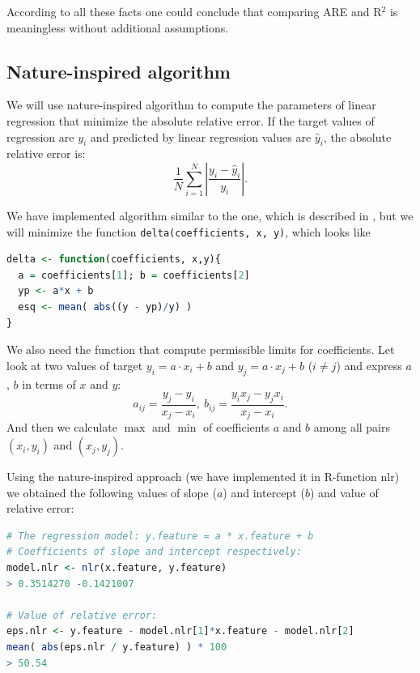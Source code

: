 According to all these facts one could conclude that comparing ARE and R$^2$  is meaningless without additional assumptions.


\subsection{Nature-inspired algorithm}
We will use nature-inspired algorithm to compute the parameters of linear regression that minimize the absolute relative error. If the target values of regression are $y_i$ and predicted by linear regression values are $\hat{y}_i$, the  absolute relative error is:
\begin{equation}
\frac{1}{N} \sum_{i=1}^{N}{\left\vert \frac{y_i - \hat{y}_i}{y_i} \right\vert}.
\end{equation}

We have implemented algorithm similar to the one, which is described in \cite{CCODA_Mirkin}, but we will minimize the function \texttt{delta(coefficients, x, y)}, which looks like
\begin{lstlisting}[language=R]
delta <- function(coefficients, x,y){
  a = coefficients[1]; b = coefficients[2]
  yp <- a*x + b
  esq <- mean( abs((y - yp)/y) ) 
} 
\end{lstlisting}

We also need the function that compute permissible limits for coefficients. Let look at two values of target $y_i = a \cdot x_i + b$ and $y_j = a \cdot x_j + b$ ($i \neq j$) and express $a$, $b$ in terms of $x$ and $y$:
\begin{equation*}
a_{ij} = \frac{y_j - y_i}{x_j - x_i}, \ b_{ij} = \frac{y_i x_j - y_j x_i}{x_j - x_i}.
\end{equation*}
And then we calculate $\max$ and $\min$ of coefficients $a$ and $b$ among all pairs $(x_i,y_i)$ and $(x_j,y_j)$. 


Using the nature-inspired approach (we have implemented it in R-function nlr) we obtained the following values
of slope ($a$) and intercept ($b$) and value of relative error:
\begin{lstlisting}[language=R]
# The regression model: y.feature = a * x.feature + b
# Coefficients of slope and intercept respectively:
model.nlr <- nlr(x.feature, y.feature) 
> 0.3514270 -0.1421007

# Value of relative error:
eps.nlr <- y.feature - model.nlr[1]*x.feature - model.nlr[2]
mean( abs(eps.nlr / y.feature) ) * 100
> 50.54
\end{lstlisting}

